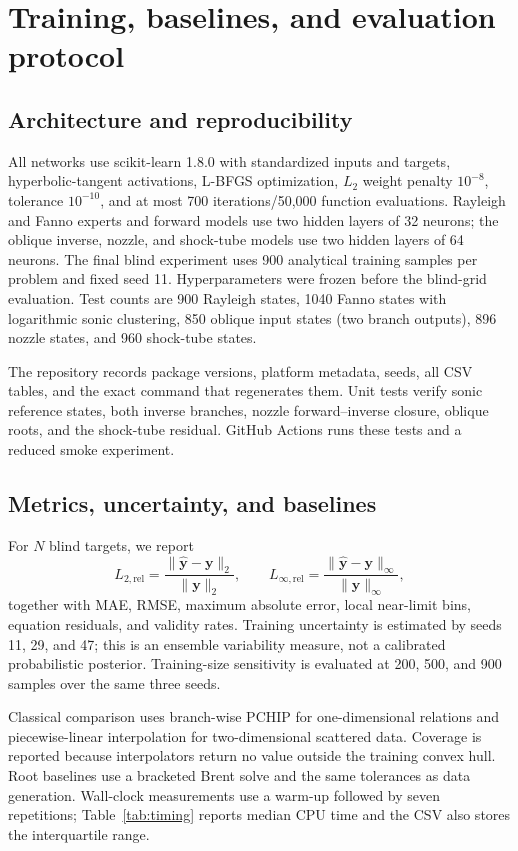 \documentclass[11pt]{article}
\newenvironment{revision}{\color{revisionblue}}{}
\newenvironment{revision}{}{}
\newcommand{\relLtwo}{L_{2,\mathrm{rel}}}
\newcommand{\relLinf}{L_{\infty,\mathrm{rel}}}
\begin{document}
\begin{revision}
\section{Training, baselines, and evaluation protocol}
\subsection{Architecture and reproducibility}
All networks use scikit-learn 1.8.0 with standardized inputs and targets, hyperbolic-tangent activations, L-BFGS optimization, $L_2$ weight penalty $10^{-8}$, tolerance $10^{-10}$, and at most 700 iterations/50,000 function evaluations. Rayleigh and Fanno experts and forward models use two hidden layers of 32 neurons; the oblique inverse, nozzle, and shock-tube models use two hidden layers of 64 neurons. The final blind experiment uses 900 analytical training samples per problem and fixed seed 11. Hyperparameters were frozen before the blind-grid evaluation. Test counts are 900 Rayleigh states, 1040 Fanno states with logarithmic sonic clustering, 850 oblique input states (two branch outputs), 896 nozzle states, and 960 shock-tube states.

The repository records package versions, platform metadata, seeds, all CSV tables, and the exact command that regenerates them. Unit tests verify sonic reference states, both inverse branches, nozzle forward--inverse closure, oblique roots, and the shock-tube residual. GitHub Actions runs these tests and a reduced smoke experiment.

\subsection{Metrics, uncertainty, and baselines}
For $N$ blind targets, we report
\begin{equation}
\relLtwo=\frac{\|\widehat{\mathbf y}-\mathbf y\|_2}{\|\mathbf y\|_2},\qquad
\relLinf=\frac{\|\widehat{\mathbf y}-\mathbf y\|_\infty}{\|\mathbf y\|_\infty},
\end{equation}
together with MAE, RMSE, maximum absolute error, local near-limit bins, equation residuals, and validity rates. Training uncertainty is estimated by seeds 11, 29, and 47; this is an ensemble variability measure, not a calibrated probabilistic posterior. Training-size sensitivity is evaluated at 200, 500, and 900 samples over the same three seeds.

Classical comparison uses branch-wise PCHIP for one-dimensional relations and piecewise-linear interpolation for two-dimensional scattered data. Coverage is reported because interpolators return no value outside the training convex hull. Root baselines use a bracketed Brent solve and the same tolerances as data generation. Wall-clock measurements use a warm-up followed by seven repetitions; Table~\ref{tab:timing} reports median CPU time and the CSV also stores the interquartile range.


\end{revision}
\end{document}
